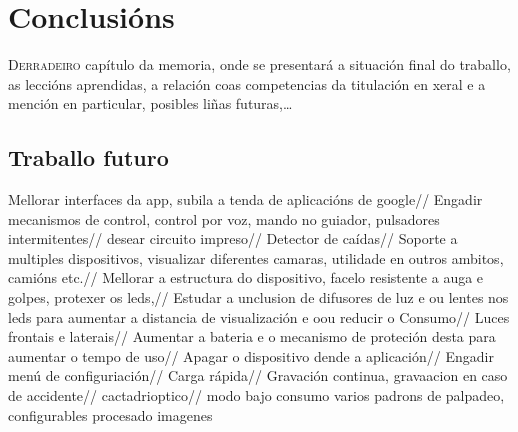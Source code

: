 \chapter{Conclusións}
\label{chap:conclusions}

\lettrine{D}{erradeiro} capítulo da memoria, onde se presentará a
situación final do traballo, as leccións aprendidas, a relación coas
competencias da titulación en xeral e a mención en particular,
posibles liñas futuras,\dots
\section{Traballo futuro}
Mellorar interfaces da app, subila a tenda de aplicacións de google//
Engadir mecanismos de control, control por voz, mando no guiador, pulsadores intermitentes//
desear circuito impreso//
Detector de caídas//
Soporte a multiples dispositivos, visualizar diferentes camaras, utilidade en outros ambitos, camións etc.//
Mellorar a estructura do dispositivo, facelo resistente a auga e golpes, protexer os leds,//
Estudar a unclusion de difusores de luz e ou lentes nos leds para aumentar a distancia de visualización e oou reducir o Consumo//
Luces frontais e laterais//
Aumentar a bateria e o mecanismo de proteción desta para aumentar o tempo de uso//
Apagar o dispositivo dende a aplicación//
Engadir menú de configuriación//
Carga rápida//
Gravación continua, gravaacion en caso de accidente//
cactadrioptico//
modo bajo consumo
varios padrons de palpadeo, configurables
procesado imagenes
